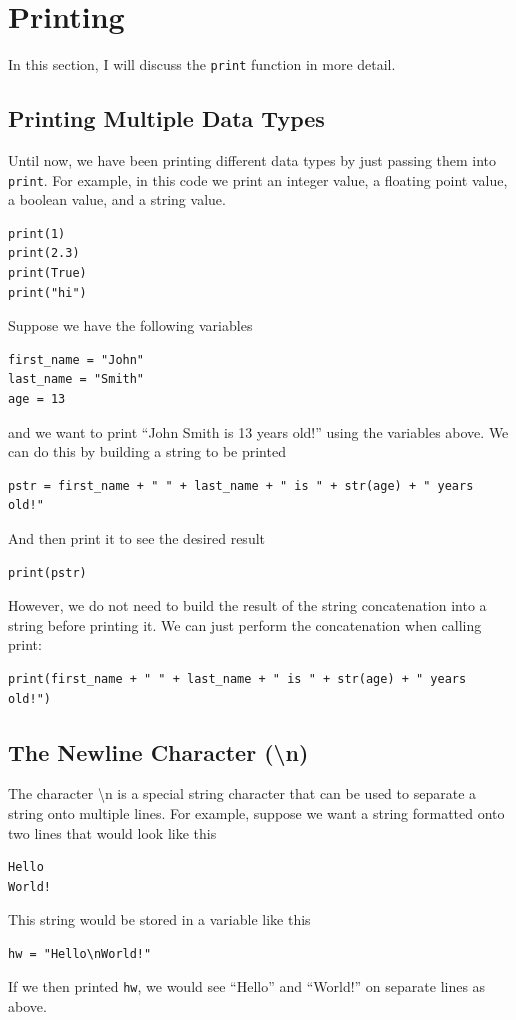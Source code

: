 \documentclass{article}
\begin{document}
\section{Printing}
In this section, I will discuss the \texttt{print} function in more detail.

\subsection{Printing Multiple Data Types}
Until now, we have been printing different data types by just passing them into \texttt{print}. For example, in this code we print an integer value, a floating point value, a boolean value, and a string value.
\begin{verbatim}
print(1)
print(2.3)
print(True)
print("hi")
\end{verbatim}
Suppose we have the following variables
\begin{verbatim}
first_name = "John"
last_name = "Smith"
age = 13
\end{verbatim}
and we want to print ``John Smith is 13 years old!'' using the variables above. We can do this by building a string to be printed
\begin{verbatim}
pstr = first_name + " " + last_name + " is " + str(age) + " years old!"
\end{verbatim}
And then print it to see the desired result
\begin{verbatim}
print(pstr)
\end{verbatim}
However, we do not need to build the result of the string concatenation into a string before printing it. We can just perform the concatenation when calling print:
\begin{verbatim}
print(first_name + " " + last_name + " is " + str(age) + " years old!")
\end{verbatim}

\subsection{The Newline Character (\textbackslash n)}
The character \textbackslash n is a special string character that can be used to separate a string onto multiple lines. For example, suppose we want a string formatted onto two lines that would look like this
\begin{verbatim}
Hello
World!
\end{verbatim}
This string would be stored in a variable like this
\begin{verbatim}
hw = "Hello\nWorld!"
\end{verbatim}
If we then printed \texttt{hw}, we would see ``Hello'' and ``World!'' on separate lines as above.
\end{document}
